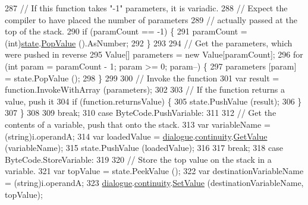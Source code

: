\begin{DoxyCode}
287                     \textcolor{comment}{// If this function takes "-1" parameters, it is variadic.}
288                     \textcolor{comment}{// Expect the compiler to have placed the number of parameters}
289                     \textcolor{comment}{// actually passed at the top of the stack.}
290                     \textcolor{keywordflow}{if} (paramCount == -1) \{
291                         paramCount = (int)\hyperlink{a00072_a70f2ce6201cdd2430ceaa764ac614ca0}{state}.\hyperlink{a00075_a36881a888ea2839d74c3d4e7c199f4ee}{PopValue} ().AsNumber;
292                     \}
293 
294                     \textcolor{comment}{// Get the parameters, which were pushed in reverse}
295                     Value[] parameters = \textcolor{keyword}{new} Value[paramCount];
296                     \textcolor{keywordflow}{for} (\textcolor{keywordtype}{int} param = paramCount - 1; param >= 0; param--) \{
297                         parameters [param] = state.PopValue ();
298                     \}
299 
300                     \textcolor{comment}{// Invoke the function}
301                     var result = function.InvokeWithArray (parameters);
302 
303                     \textcolor{comment}{// If the function returns a value, push it}
304                     \textcolor{keywordflow}{if} (\textcolor{keyword}{function}.returnsValue) \{
305                         state.PushValue (result);
306                     \}
307                 \}
308 
309                 \textcolor{keywordflow}{break};
310             \textcolor{keywordflow}{case} ByteCode.PushVariable:
311 
312                 \textcolor{comment}{// Get the contents of a variable, push that onto the stack.}
313                 var variableName = (string)i.operandA;
314                 var loadedValue = \hyperlink{a00072_ac506426c503da5f033247c29e11c5e82}{dialogue}.\hyperlink{a00036_ae94eaa4b03b432422f5d205fabe37ff5}{continuity}.\hyperlink{a00088_accab1fc5c8fc353dbfc53ca0f4029576}{GetValue} (variableName);
315                 state.PushValue (loadedValue);
316 
317                 \textcolor{keywordflow}{break};
318             \textcolor{keywordflow}{case} ByteCode.StoreVariable:
319 
320                 \textcolor{comment}{// Store the top value on the stack in a variable.}
321                 var topValue = state.PeekValue ();
322                 var destinationVariableName = (string)i.operandA;
323                 \hyperlink{a00072_ac506426c503da5f033247c29e11c5e82}{dialogue}.\hyperlink{a00036_ae94eaa4b03b432422f5d205fabe37ff5}{continuity}.\hyperlink{a00088_aa90ff61224432c5ed3ce72199c55f440}{SetValue} (destinationVariableName, topValue);

\end{DoxyCode}
